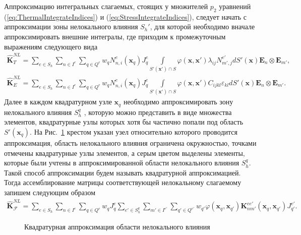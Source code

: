 Аппроксимацию интегральных слагаемых, стоящих у множителей $p_2$ уравнений (\ref{eq:ThermalIntegrateIndices}) и (\ref{eq:StressIntegrateIndices}), следует начать с аппроксимации зоны нелокального влияния $S_h'$, для которой необходимо вначале аппроксимировать внешние интегралы, где приходим к промежуточным выражениям следующего вида
\begin{gather*}
	\widehat{\textbf{K}}^{NL}_T =
	\sum\limits_{e \in S_h}
	\sum\limits_{n \in I^e}
	\sum\limits_{q \in Q^e}
	w_q N_{n,i}^e (\boldsymbol{x}_q) J_q^e
	\int\limits_{S'(\boldsymbol{x}') \cap S}
	\varphi( \boldsymbol{x}, \boldsymbol{x}' )
	\lambda_{ij}
	N_{m', j}^{e'} dS'(\boldsymbol{x})
	\boldsymbol{E}_n \otimes \boldsymbol{E}_{m'}, \\
	\widehat{\textbf{K}}^{NL}_E =
	\sum\limits_{e \in S_h}
	\sum\limits_{n \in I^e}
	\sum\limits_{q \in Q^e}
	w_q N_{n,i}^e (\boldsymbol{x}_q) J_q^e
	\int\limits_{S'(\boldsymbol{x}') \cap S}
	\varphi(\boldsymbol{x}, \boldsymbol{x}') C_{ijkl} \varepsilon_{kl} dS'(\boldsymbol{x})
	\boldsymbol{E}_n \otimes \boldsymbol{E}_{m'}.
\end{gather*}
Далее в каждом квадратурном узле $\boldsymbol{x}_q$ необходимо аппроксимировать зону нелокального влияния $S_h^q$ \cite{Pisano1}, которую можно представить в виде множества элементов, квадратурные узлы которых хотя бы частично попали под область $S'(\boldsymbol{x}_q)$. На Рис.~\ref{fig:ApproxSQ} крестом указан узел относительно которого проводится аппроксимация, область нелокального влияния ограничена окружностью, точками отмечены квадратурные узлы элементов, а серым цветом выделены элементы, которые были учтены в аппроксимированной области нелокального влияния $S_h^q$. Такой способ аппроксимации будем называть квадратурной аппроксимацией. Тогда ассемблирование матрицы соответствующей нелокальному слагаемому запишем следующим образом
\begin{gather}
	\label{eq:ApproxNonloc}
	\widehat{\textbf{K}}^{NL}_{\mathcal{F}} =
	\sum\limits_{e \in S_h}
	\sum\limits_{n \in I^e}
	\sum\limits_{q \in Q^e}
	w_q J_q^e
	\sum\limits_{e' \in S_h^q}
	\sum\limits_{m' \in I^{e'}}
	\sum\limits_{q' \in Q^{e'}}
	w_{q'} \varphi(\boldsymbol{x}_q, \boldsymbol{x}_{q'}) 
	\textbf{K}_{nm'}^{e e'}(\boldsymbol{x}_q, \boldsymbol{x}_{q'}) J_{q'}^{e'}.
\end{gather}

\begin{figure}[ht]
    \caption{Квадратурная аппроксимация области нелокального влияния}\label{fig:ApproxSQ}
\end{figure}

